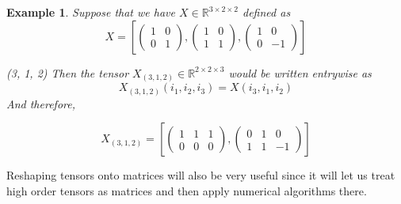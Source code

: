 \documentclass[11pt,a4paper,openright,oneside]{book}
\numberwithin{equation}{section}
\newtheorem{example0}[defn0]{Example}
\newenvironment{example}{ \begin{example0}\rm}{\end{example0}}
\begin{document}
\begin{example}
    Suppose that we have $X \in \mathbb{R}^{3 \times 2 \times 2}$ defined as
    $$X = \left[\begin{pmatrix}
            1 & 0 \\
            0 & 1
        \end{pmatrix}, 
        \begin{pmatrix}
            1 & 0 \\
            1 & 1
        \end{pmatrix},
        \begin{pmatrix}
            1 & 0 \\
            0 & -1
        \end{pmatrix}
        \right]$$

        (3, 1, 2)
        Then the tensor $X_{(3, 1, 2)} \in \mathbb{R}^{2 \times 2 \times 3}$ would be written entrywise as
        $$X_{(3, 1, 2)}(i_1, i_2, i_3) = X(i_3, i_1, i_2)$$
        And therefore,

        $$X_{(3,1,2)} = \left[\begin{pmatrix} 1 & 1 & 1 \\ 0 & 0 & 0  \end{pmatrix}, \begin{pmatrix}  0 & 1 & 0 \\ 1 & 1 & -1 \end{pmatrix} \right]$$ 


    \label{ex:perm}
\end{example}

Reshaping tensors onto matrices will also be very useful since it will let us treat high order tensors as matrices and then apply numerical algorithms
there.
\end{document}
